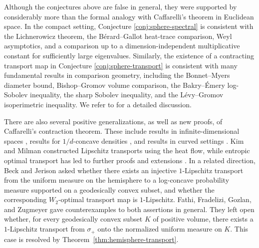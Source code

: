 \documentclass[11pt,reqno]{amsart}
\numberwithin{equation}{section}
\theoremstyle{definition}
\theoremstyle{remark}
\newcommand{\0}{\emptyset}
\begin{document}
Although the conjectures above are false in general, they were supported by considerably more than the formal analogy with Caffarelli's theorem in Euclidean space. In the compact setting, Conjecture \ref{conj:sphere-spectral} is consistent with the Lichnerowicz theorem, the Bérard--Gallot heat-trace comparison, Weyl asymptotics, and a comparison up to a dimension-independent multiplicative constant for sufficiently large eigenvalues. Similarly, the existence of a contracting transport map in Conjecture \ref{conj:sphere-transport} is consistent with many fundamental results in comparison geometry, including the Bonnet--Myers diameter bound, Bishop--Gromov volume comparison, the Bakry--\'Emery log-Sobolev inequality, the sharp Sobolev inequality, and the L\'evy--Gromov isoperimetric inequality. We refer to \cite[Sections 1 and 2]{milman2018spectral} for a detailed discussion. 

There are also several positive generalizations, as well as new proofs, of Caffarelli's contraction theorem. These include results in infinite-dimensional spaces \cite{feyel2004monge,mikulincer2024brownian}, results for $1/d$-concave densities \cite{carlier2024optimal}, and results in curved settings \cite{fathi2024transportation,lopez2025bakry,ge2025generalization}. Kim and Milman \cite{kim2012generalization} constructed Lipschitz transports using the heat flow, while entropic optimal transport has led to further proofs and extensions \cite{chewi2023entropic,fathi2020proof}. In a related direction, Beck and Jerison \cite{beck2021friedland} asked whether there exists an injective $1$-Lipschitz transport from the uniform measure on the hemisphere to a
log-concave probability measure supported on a geodesically convex subset, and whether the corresponding $W_2$-optimal transport map is $1$-Lipschitz. Fathi, Fradelizi, Gozlan, and Zugmeyer \cite{fathi2023some} gave counterexamples to both assertions in general. They left open whether, for every geodesically convex subset $K$ of positive volume, there exists a $1$-Lipschitz transport from $\sigma_+$
onto the normalized uniform measure on $K$. This case is resolved by Theorem~\ref{thm:hemisphere-transport}.
\end{document}
